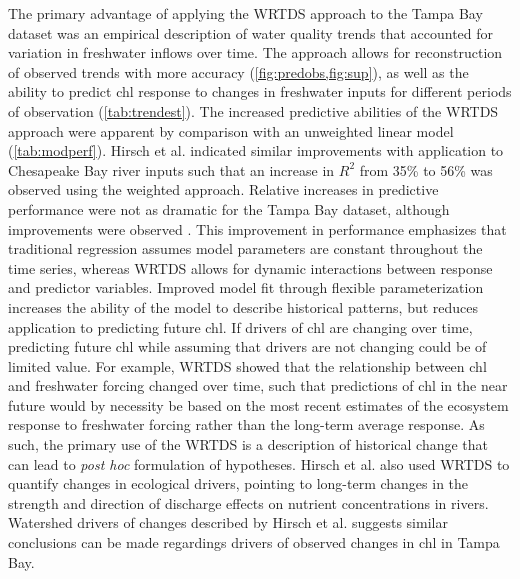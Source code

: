 \documentclass{svjour3}\usepackage[]{graphicx}\usepackage[]{color}
\begin{document}
The primary advantage of applying the \ac{WRTDS} approach to the Tampa Bay dataset was an empirical description of water quality trends that accounted for variation in freshwater inflows over time. The approach allows for reconstruction of observed trends  with more accuracy (\cref{fig:predobs,fig:sup}), as well as the ability to predict \ac{chl} response to changes in freshwater inputs for different periods of observation (\cref{tab:trendest}). The increased predictive abilities of the \ac{WRTDS} approach were apparent by comparison with an unweighted linear model (\cref{tab:modperf}).  Hirsch et al. \cite{Hirsch10} indicated similar improvements with application to Chesapeake Bay river inputs such that an increase in $R^2$ from 35\% to 56\% was observed using the weighted approach.  Relative increases in predictive performance were not as dramatic for the Tampa Bay dataset, although improvements were observed \cite{Hirsch10}.  This improvement in performance emphasizes that traditional regression assumes model parameters are constant throughout the time series, whereas \ac{WRTDS} allows for dynamic interactions between response and predictor variables.  Improved model fit through flexible parameterization increases the ability of the model to describe historical patterns, but reduces application to predicting future \ac{chl}.  If drivers of \ac{chl} are changing over time, predicting future \ac{chl} while assuming that drivers are not changing could be of limited value.  For example, \ac{WRTDS} showed that the relationship between \ac{chl} and freshwater forcing changed over time, such that predictions of \ac{chl} in the near future would by necessity be based on the most recent estimates of the ecosystem response to freshwater forcing rather than the long-term average response.  As such, the primary use of the \ac{WRTDS} is a description of historical change that can lead to \textit{post hoc} formulation of hypotheses.  Hirsch et al. \cite{Hirsch10} also used WRTDS to quantify changes in ecological drivers, pointing to long-term changes in the strength and direction of discharge effects on nutrient concentrations in rivers.  Watershed drivers of changes described by Hirsch et al. \cite{Hirsch10} suggests similar conclusions can be made regardings drivers of observed changes in \ac{chl} in Tampa Bay.  
\end{document}
